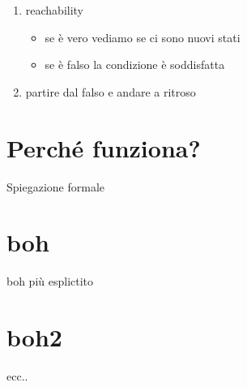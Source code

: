 \documentclass[12pt]{article}
\begin{document}
	\begin{enumerate}
		\item reachability
		\begin{itemize}
			\item se è vero vediamo se ci sono nuovi stati
			\item se è falso la condizione è soddisfatta
		\end{itemize}
		\item partire dal falso e andare a ritroso
	\end{enumerate}

	\section{Perché funziona?}
	Spiegazione formale

	\section{boh}
	boh più esplictito

	\section{boh2}
	ecc..
\end{document}
